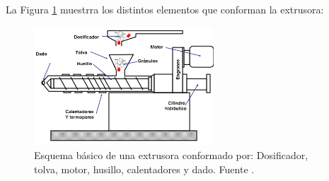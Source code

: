 La Figura \ref{fig:estado_extrusora} muestrra los distintos elementos que conforman la extrusora:

\begin{figure}[h!]
    \centering
    \includegraphics[width=0.6\textwidth]{images/extrusor.png}
    \caption[Esquema básico de una extrusora.]{Esquema básico de una extrusora conformado por: Dosificador, tolva, motor, husillo, calentadores y dado. Fuente \cite{disenoextrusor}.}
    \label{fig:estado_extrusora}
\end{figure}

